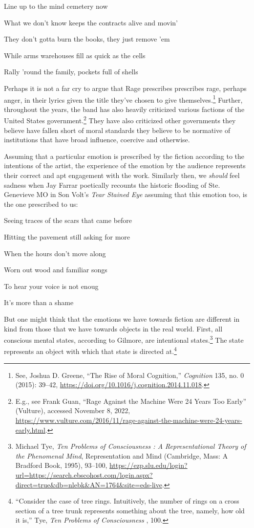 \documentclass[phdthesis,12pt,final]{wuthesis}
\theoremstyle{definition}
\theoremstyle{definition}
\theoremstyle{definition}
\theoremstyle{definition}
\theoremstyle{remark}
\begin{document}
Line up to the mind cemetery now

What we don't know keeps the contracts alive and movin'

They don't gotta burn the books, they just remove 'em

While arms warehouses fill as quick as the cells

Rally 'round the family, pockets full of shells

\noindent Perhaps it is not a far cry to argue that Rage prescribes prescribes rage, perhaps anger, in their lyrics given the title they've chosen to give themselves.\footnote{See, Joshua D. Greene, {``The Rise of Moral Cognition,''} \emph{Cognition} 135, no. 0 (2015): 39--42, \url{https://doi.org/10.1016/j.cognition.2014.11.018}.} Further, throughout the years, the band has also heavily criticized various factions of the United States government.\footnote{E.g., see Frank Guan, {``Rage Against the Machine Were 24 Years Too Early''} (Vulture), accessed November 8, 2022, \url{https://www.vulture.com/2016/11/rage-against-the-machine-were-24-years-early.html}.} They have also criticized other governments they believe have fallen short of moral standards they believe to be normative of institutions that have broad influence, coercive and otherwise.

Assuming that a particular emotion is prescribed by the fiction according to the intentions of the artist, the experience of the emotion by the audience represents their correct and apt engagement with the work. Similarly then, we \emph{should} feel sadness when Jay Farrar poetically recounts the historic flooding of Ste. Genevieve MO in Son Volt's \emph{Tear Stained Eye} assuming that this emotion too, is the one prescribed to us:

Seeing traces of the scars that came before

Hitting the pavement still asking for more

When the hours don't move along

Worn out wood and familiar songs

To hear your voice is not enoug

It's more than a shame

But one might think that the emotions we have towards fiction are different in kind from those that we have towards objects in the real world. First, all conscious mental states, according to Gilmore, are intentional states.\footnote{Michael Tye, \emph{Ten {Problems} of {Consciousness} : {A Representational Theory} of the {Phenomenal Mind}}, Representation and {Mind} (Cambridge, Mass: A Bradford Book, 1995), 93--100, \url{https://ezp.slu.edu/login?url=https://search.ebscohost.com/login.aspx?direct=true&db=nlebk&AN=1764&site=eds-live}.} The state represents an object with which that state is directed at.\footnote{``Consider the case of tree rings. Intuitively, the number of rings on a cross section of a tree trunk represents something about the tree, namely, how old it is,'' Tye, \emph{Ten {Problems} of {Consciousness} }, 100.}
\end{document}
